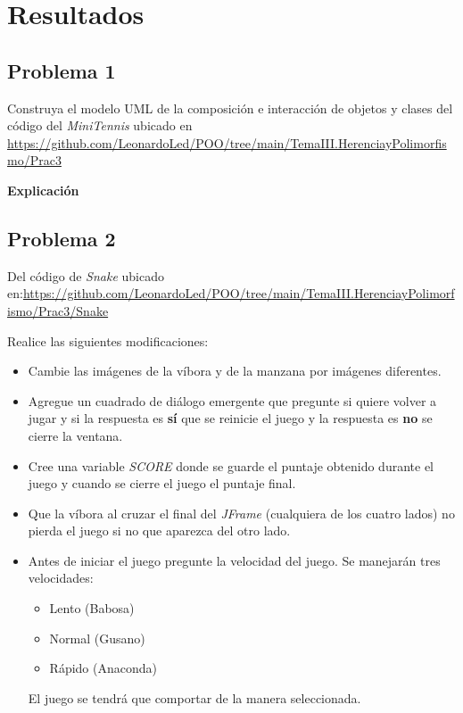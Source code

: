 \documentclass[11pt, twocolumn]{article}
\begin{document}
  \section*{Resultados}
  \subsection*{Problema 1}
  Construya el modelo UML de la composición e interacción de objetos y clases del código del \textit{MiniTennis} ubicado en \url{https://github.com/LeonardoLed/POO/tree/main/TemaIII.HerenciayPolimorfismo/Prac3}
  
  \textbf{Explicación} \\



  
  \subsection*{Problema 2}
  Del código de \textit{Snake} ubicado en:\url{https://github.com/LeonardoLed/POO/tree/main/TemaIII.HerenciayPolimorfismo/Prac3/Snake}

  Realice las siguientes modificaciones:
  \begin{itemize}
    \item Cambie las imágenes de la víbora y de la manzana por imágenes diferentes.
    \item Agregue un cuadrado de diálogo emergente que pregunte si quiere volver a jugar y si la respuesta es \textbf{sí} que se reinicie el juego y la respuesta es \textbf{no} se cierre la ventana.
    \item Cree una variable \textit{SCORE} donde se guarde el puntaje obtenido durante el juego y cuando se cierre el juego el puntaje final.
    \item Que la víbora al cruzar el final del \textit{JFrame} (cualquiera de los cuatro lados) no pierda el juego si no que aparezca del otro lado.
    \item Antes de iniciar el juego pregunte la velocidad del juego. Se manejarán tres
    velocidades:
    \begin{itemize}
      \item Lento (Babosa)
      \item Normal (Gusano)
      \item Rápido (Anaconda)
    \end{itemize}
    El juego se tendrá que comportar de la manera seleccionada.
  \end{itemize}
\end{document}
